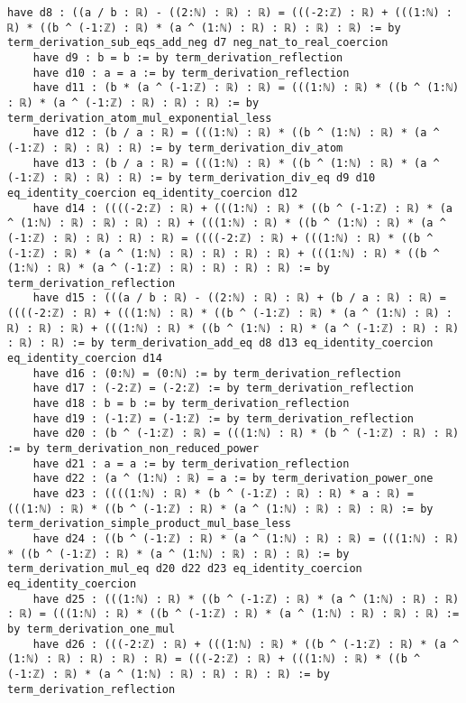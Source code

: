 \documentclass{article}
\begin{document}
\begin{tcolorbox}[colback=white!10, width=\linewidth]
\begin{lstlisting}[language=Lean4]
    have d8 : ((a / b : ℝ) - ((2:ℕ) : ℝ) : ℝ) = (((-2:ℤ) : ℝ) + (((1:ℕ) : ℝ) * ((b ^ (-1:ℤ) : ℝ) * (a ^ (1:ℕ) : ℝ) : ℝ) : ℝ) : ℝ) := by term_derivation_sub_eqs_add_neg d7 neg_nat_to_real_coercion
    have d9 : b = b := by term_derivation_reflection
    have d10 : a = a := by term_derivation_reflection
    have d11 : (b * (a ^ (-1:ℤ) : ℝ) : ℝ) = (((1:ℕ) : ℝ) * ((b ^ (1:ℕ) : ℝ) * (a ^ (-1:ℤ) : ℝ) : ℝ) : ℝ) := by term_derivation_atom_mul_exponential_less
    have d12 : (b / a : ℝ) = (((1:ℕ) : ℝ) * ((b ^ (1:ℕ) : ℝ) * (a ^ (-1:ℤ) : ℝ) : ℝ) : ℝ) := by term_derivation_div_atom
    have d13 : (b / a : ℝ) = (((1:ℕ) : ℝ) * ((b ^ (1:ℕ) : ℝ) * (a ^ (-1:ℤ) : ℝ) : ℝ) : ℝ) := by term_derivation_div_eq d9 d10 eq_identity_coercion eq_identity_coercion d12
    have d14 : ((((-2:ℤ) : ℝ) + (((1:ℕ) : ℝ) * ((b ^ (-1:ℤ) : ℝ) * (a ^ (1:ℕ) : ℝ) : ℝ) : ℝ) : ℝ) + (((1:ℕ) : ℝ) * ((b ^ (1:ℕ) : ℝ) * (a ^ (-1:ℤ) : ℝ) : ℝ) : ℝ) : ℝ) = ((((-2:ℤ) : ℝ) + (((1:ℕ) : ℝ) * ((b ^ (-1:ℤ) : ℝ) * (a ^ (1:ℕ) : ℝ) : ℝ) : ℝ) : ℝ) + (((1:ℕ) : ℝ) * ((b ^ (1:ℕ) : ℝ) * (a ^ (-1:ℤ) : ℝ) : ℝ) : ℝ) : ℝ) := by term_derivation_reflection
    have d15 : (((a / b : ℝ) - ((2:ℕ) : ℝ) : ℝ) + (b / a : ℝ) : ℝ) = ((((-2:ℤ) : ℝ) + (((1:ℕ) : ℝ) * ((b ^ (-1:ℤ) : ℝ) * (a ^ (1:ℕ) : ℝ) : ℝ) : ℝ) : ℝ) + (((1:ℕ) : ℝ) * ((b ^ (1:ℕ) : ℝ) * (a ^ (-1:ℤ) : ℝ) : ℝ) : ℝ) : ℝ) := by term_derivation_add_eq d8 d13 eq_identity_coercion eq_identity_coercion d14
    have d16 : (0:ℕ) = (0:ℕ) := by term_derivation_reflection
    have d17 : (-2:ℤ) = (-2:ℤ) := by term_derivation_reflection
    have d18 : b = b := by term_derivation_reflection
    have d19 : (-1:ℤ) = (-1:ℤ) := by term_derivation_reflection
    have d20 : (b ^ (-1:ℤ) : ℝ) = (((1:ℕ) : ℝ) * (b ^ (-1:ℤ) : ℝ) : ℝ) := by term_derivation_non_reduced_power
    have d21 : a = a := by term_derivation_reflection
    have d22 : (a ^ (1:ℕ) : ℝ) = a := by term_derivation_power_one
    have d23 : ((((1:ℕ) : ℝ) * (b ^ (-1:ℤ) : ℝ) : ℝ) * a : ℝ) = (((1:ℕ) : ℝ) * ((b ^ (-1:ℤ) : ℝ) * (a ^ (1:ℕ) : ℝ) : ℝ) : ℝ) := by term_derivation_simple_product_mul_base_less
    have d24 : ((b ^ (-1:ℤ) : ℝ) * (a ^ (1:ℕ) : ℝ) : ℝ) = (((1:ℕ) : ℝ) * ((b ^ (-1:ℤ) : ℝ) * (a ^ (1:ℕ) : ℝ) : ℝ) : ℝ) := by term_derivation_mul_eq d20 d22 d23 eq_identity_coercion eq_identity_coercion
    have d25 : (((1:ℕ) : ℝ) * ((b ^ (-1:ℤ) : ℝ) * (a ^ (1:ℕ) : ℝ) : ℝ) : ℝ) = (((1:ℕ) : ℝ) * ((b ^ (-1:ℤ) : ℝ) * (a ^ (1:ℕ) : ℝ) : ℝ) : ℝ) := by term_derivation_one_mul
    have d26 : (((-2:ℤ) : ℝ) + (((1:ℕ) : ℝ) * ((b ^ (-1:ℤ) : ℝ) * (a ^ (1:ℕ) : ℝ) : ℝ) : ℝ) : ℝ) = (((-2:ℤ) : ℝ) + (((1:ℕ) : ℝ) * ((b ^ (-1:ℤ) : ℝ) * (a ^ (1:ℕ) : ℝ) : ℝ) : ℝ) : ℝ) := by term_derivation_reflection

\end{lstlisting}
\end{tcolorbox}
\end{document}
